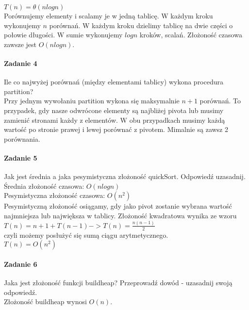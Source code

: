 \documentclass[18pt]{extarticle}
\begin{document}
$T(n)=\theta(nlogn)$ \\

Porównujemy elementy i scalamy je w jedną tablicę. W każdym kroku wykonujemy $n$ porównań. W każdym kroku dzielimy tablicę na dwie części o połowie długości. W sumie wykonujemy $logn$ kroków, scalań. Złożoność czasowa zawsze jest $O(nlogn)$.

\paragraph{Zadanie 4} Ile co najwyżej porównań (między elementami tablicy) wykona procedura partition? \\


Przy jednym wywołaniu partition wykona się maksymalnie $n+1$ porównań. To przypadek, gdy nasze odwrócone elementy są najbliżej pivota lub musimy zamienić stronami każdy z elementów. W obu przypadkach musimy każdą wartość po stronie prawej i lewej porównać z pivotem. Mimalnie są zawsz 2 porównania.

\paragraph{Zadanie 5} Jak jest średnia a jaka pesymistyczna złożoność quickSort. Odpowiedź uzasadnij. \\


Średnia złożoność czasowa: $O(nlogn)$ \\

Pesymistyczna złożoność czasowa: $O(n^2)$ \\

Pesymistyczną złożoność osiągamy, gdy jako pivot zostanie wybrana wartość najmniejsza lub największa w tablicy. Złożoność kwadratowa wynika ze wzoru \\

$T(n) = n + 1 + T(n-1) -> T(n)=\frac{n(n-1)}{2}$ \\

czyli możemy posłużyć się sumą ciągu arytmetycznego.\\

$T(n)=O(n^2)$

\paragraph{Zadanie 6} Jaka jest złożoność funkcji buildheap? Przeprowadź dowód - uzasadnij swoją odpowiedź. \\

Złożoność buildheap wynosi $O(n)$.\\
\end{document}
